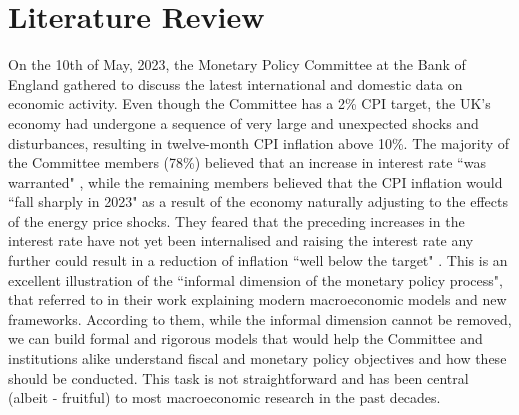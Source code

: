 \section{Literature Review}

On the 10th of May, 2023, the Monetary Policy Committee at the Bank of England gathered to discuss the latest international and domestic data on economic activity. Even though the Committee has a 2\% CPI target, the UK's economy had undergone a sequence of very large and unexpected shocks and disturbances, resulting in twelve-month CPI inflation above 10\%. The majority of the Committee members (78\%) believed that an increase in interest rate ``was warranted" \parencite[4]{boe_2023_monetary}, while the remaining members believed that the CPI inflation would ``fall sharply in 2023" \parencite[5]{boe_2023_monetary} as a result of the economy naturally adjusting to the effects of the energy price shocks. They feared that the preceding increases in the interest rate have not yet been internalised and raising the interest rate any further could result in a reduction of inflation ``well below the target" \parencite[5]{boe_2023_monetary}. This is an excellent illustration of the ``informal dimension of the monetary policy process", that \parencite[26]{gals_2007_macroeconomic} referred to in their work explaining modern macroeconomic models and new frameworks. According to them, while the informal dimension cannot be removed, we can build formal and rigorous models that would help the Committee and institutions alike understand fiscal and monetary policy objectives and how these should be conducted. This task is not straightforward and has been central (albeit - fruitful) to most macroeconomic research in the past decades. 

